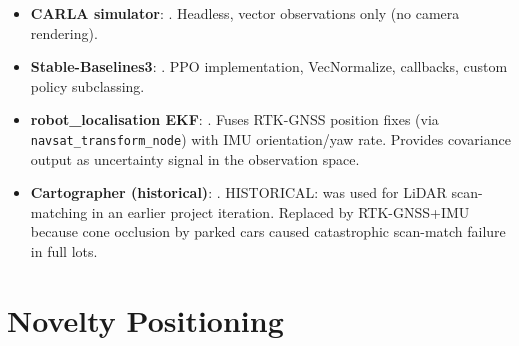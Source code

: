\documentclass[11pt,a4paper]{article}
\begin{document}
\begin{itemize}[leftmargin=*]
  \item \textbf{CARLA simulator}: \cite{dosovitskiy2017carla}.
        Headless, vector observations only (no camera rendering).

  \item \textbf{Stable-Baselines3}: \cite{raffin2021stable}.
        PPO implementation, VecNormalize, callbacks, custom policy subclassing.

  \item \textbf{robot\_localisation EKF}: \cite{robotlocalization, moore2014generalized}.
        Fuses RTK-GNSS position fixes (via \texttt{navsat\_transform\_node})
        with IMU orientation/yaw rate. Provides covariance output as
        uncertainty signal in the observation space.

  \item \textbf{Cartographer (historical)}: \cite{cartographer2016}.
        HISTORICAL: was used for LiDAR scan-matching in an earlier project
        iteration. Replaced by RTK-GNSS+IMU because cone occlusion by parked
        cars caused catastrophic scan-match failure in full lots.
\end{itemize}

\section{Novelty Positioning}
\end{document}
